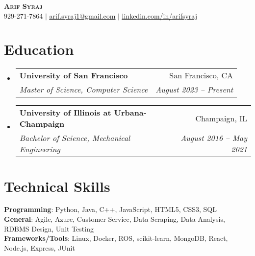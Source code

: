 \documentclass[letterpaper,11pt]{article}
\makeatletter
\newcommand{\resumeSubheading}[4]{
  \vspace{-2pt}\item
    \begin{tabular*}{0.97\textwidth}[t]{l@{\extracolsep{\fill}}r}
      \textbf{#1} & #2 \\
      \textit{\small#3} & \textit{\small #4} \\
    \end{tabular*}\vspace{-7pt}
}
\newcommand{\resumeSubHeadingListStart}
{\begin{itemize}[leftmargin=0.15in, label={}]}
\newcommand{\resumeSubHeadingListEnd}{\end{itemize}}
\makeatother
\begin{document}

\begin{center}
  \textbf{\Huge \scshape Arif Syraj} \\ \vspace{1pt}
  \small 929-271-7864 $|$ \href{mailto:x@x.com}{\underline{arif.syraj1@gmail.com}} $|$
  \href{https://linkedin.com/in/...}{\underline{linkedin.com/in/arifsyraj}} %
\end{center}


\section{Education}
\resumeSubHeadingListStart
\resumeSubheading
{University of San Francisco}{San Francisco, CA}
{Master of Science, Computer Science}{August 2023 -- Present}
\resumeSubheading
{University of Illinois at Urbana-Champaign}{Champaign, IL}
{Bachelor of Science, Mechanical Engineering}{August 2016 -- May 2021}

\resumeSubHeadingListEnd


%
\section{Technical Skills}
\begin{itemize}[leftmargin=0.15in, label={}]
  \small{\item{
        \textbf{Programming}{: Python, Java, C++, JavaScript, HTML5, CSS3, SQL} \\
        \textbf{General}{: Agile, Azure, Customer Service, Data Scraping, Data Analysis, RDBMS Design, Unit Testing} \\
        \textbf{Frameworks/Tools}{: Linux, Docker, ROS, scikit-learn, MongoDB, React, Node.js, Express, JUnit}
        }}
\end{itemize}
\end{document}
